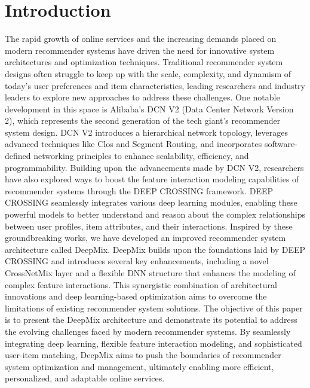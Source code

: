 \documentclass{sigkddExp}
\begin{document}
\section{Introduction}
\vspace{3mm}
The rapid growth of online services and the increasing demands placed on modern recommender systems have driven the need for innovative system architectures and optimization techniques. Traditional recommender system designs often struggle to keep up with the scale, complexity, and dynamism of today's user preferences and item characteristics, leading researchers and industry leaders to explore new approaches to address these challenges.
\vspace{3mm}\newline
One notable development in this space is Alibaba's DCN V2 (Data Center Network Version 2), which represents the second generation of the tech giant's recommender system design. DCN V2 introduces a hierarchical network topology, leverages advanced techniques like Clos and Segment Routing, and incorporates software-defined networking principles to enhance scalability, efficiency, and programmability.
\vspace{3mm}\newline
Building upon the advancements made by DCN V2, researchers have also explored ways to boost the feature interaction modeling capabilities of recommender systems through the DEEP CROSSING framework. DEEP CROSSING seamlessly integrates various deep learning modules, enabling these powerful models to better understand and reason about the complex relationships between user profiles, item attributes, and their interactions.
\vspace{3mm}\newline
Inspired by these groundbreaking works, we have developed an improved recommender system architecture called DeepMix. DeepMix builds upon the foundations laid by DEEP CROSSING and introduces several key enhancements, including a novel CrossNetMix layer and a flexible DNN structure that enhances the modeling of complex feature interactions. This synergistic combination of architectural innovations and deep learning-based optimization aims to overcome the limitations of existing recommender system solutions.
\vspace{3mm}\newline
The objective of this paper is to present the DeepMix architecture and demonstrate its potential to address the evolving challenges faced by modern recommender systems. By seamlessly integrating deep learning, flexible feature interaction modeling, and sophisticated user-item matching, DeepMix aims to push the boundaries of recommender system optimization and management, ultimately enabling more efficient, personalized, and adaptable online services.
\end{document}
